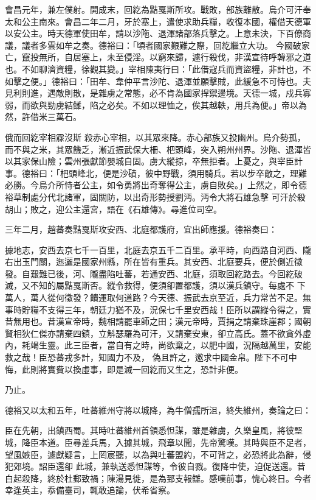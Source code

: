 \begin{pinyinscope}
 會昌元年，兼左僕射。開成末，回紇為黠戛斯所攻。戰敗，部族離散。烏介可汗奉太和公主南來。會昌二年二月，牙於塞上，遣使求助兵糧，收復本國，權借天德軍以安公主。時天德軍使田牟，請以沙陁、退渾諸部落兵擊之。上意未決，下百僚商議，議者多雲如牟之奏。德裕曰：「頃者國家艱難之際，回紇繼立大功。
 今國破家亡，竄投無所，自居塞上，未至侵淫。以窮來歸，遽行殺伐，非漢宣待呼韓邪之道也。不如聊濟資糧，徐觀其變。」宰相陳夷行曰：「此借寇兵而資盜糧，非計也，不如擊之便。」德裕曰：「田牟、韋仲平言沙陀、退渾並願擊賊，此緩急不可恃也。夫見利則進，遇敵則散，是雜虜之常態，必不肯為國家捍禦邊境。天德一城，戍兵寡弱，而欲與勁虜結讎，陷之必矣。不如以理恤之，俟其越軼，用兵為便。」帝以為然，許借米三萬石。



 俄而回紇宰相霡沒斯
 殺赤心宰相，以其眾來降。赤心部族又投幽州。烏介勢孤，而不與之米，其眾饑乏，漸近振武保大柵、杷頭峰，突入朔州州界。沙陁、退渾皆以其家保山險；雲州張獻節嬰城自固。虜大縱掠，卒無拒者。上憂之，與宰臣計事。德裕曰：「杷頭峰北，便是沙磧，彼中野戰，須用騎兵。若以步卒敵之，理難必勝。今烏介所恃者公主，如令勇將出奇奪得公主，虜自敗矣。」上然之，即令德裕草制處分代北諸軍，固關防，以出奇形勢授劉沔。沔令大將石雄急擊
 可汗於殺胡山；敗之，迎公主還宮，語在《石雄傳》。尋進位司空。



 三年二月，趙蕃奏黠戛斯攻安西、北庭都護府，宜出師應援。德裕奏曰：



 據地志，安西去京七千一百里，北庭去京五千二百里。承平時，向西路自河西、隴右出玉門關，迤邐是國家州縣，所在皆有重兵。其安西、北庭要兵，便於側近徵發。自艱難已後，河、隴盡陷吐蕃，若通安西、北庭，須取回紇路去。今回紇破滅，又不知的屬黠戛斯否。縱令救得，便須卻置都護，須以漢兵鎮守。每處不
 下萬人，萬人從何徵發？饋運取何道路？今天德、振武去京至近，兵力常苦不足。無事時貯糧不支得三年，朝廷力猶不及，況保七千里安西哉！臣所以謂縱令得之，實昔無用也。昔漢宣帝時，魏相請罷車師之田；漢元帝時，賈捐之請棄珠崖郡；國朝賢相狄仁傑亦請棄四鎮，立斛瑟羅為可汗，又請棄安東，卻立高氏。蓋不欲貪外虛內，耗竭生靈。此三臣者，當自有之時，尚欲棄之，以肥中國，況隔越萬里，安能救之哉！臣恐蕃戎多計，知國力不及，
 偽且許之，邀求中國金帛。陛下不可中悔，此則將實費以換虛事，即是滅一回紇而又生之，恐計非便。



 乃止。



 德裕又以太和五年，吐蕃維州守將以城降，為牛僧孺所沮，終失維州，奏論之曰：



 臣在先朝，出鎮西蜀。其時吐蕃維州首領悉怛謀，雖是雜虜，久樂皇風，將彼堅城，降臣本道。臣尋差兵馬，入據其城，飛章以聞，先帝驚嘆。其時與臣不足者，望風嫉臣，遽獻疑言，上罔宸聽，以為與吐蕃盟約，不可背之，必恐將此為辭，侵犯郊境。詔臣還卻
 此城，兼執送悉怛謀等，令彼自戮。復降中使，迫促送還。昔白起殺降，終於杜郵致禍；陳湯見徙，是為郅支報讎。感嘆前事，愧心終日。今者幸逢英主，忝備臺司，輒敢追論，伏希省察。




\end{pinyinscope}
